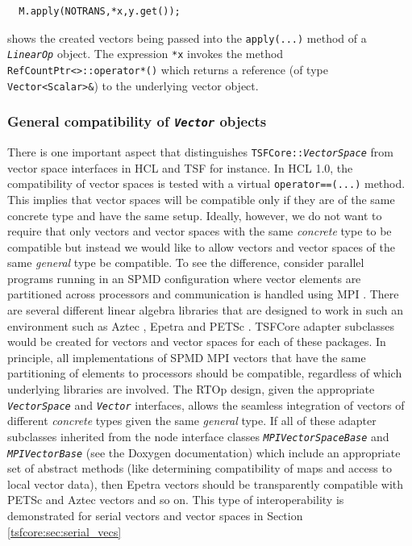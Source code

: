 {\scriptsize\begin{verbatim}
  M.apply(NOTRANS,*x,y.get());
\end{verbatim}}

{}\noindent{}shows the created vectors being passed into the
{}\texttt{apply(\-...)}  method of a {}\texttt{\textit{LinearOp}}
object.  The expression {}\texttt{*x} invokes the method
{}\texttt{RefCountPtr<>\-::operator*()} which returns a reference (of
type {}\texttt{Vector<Scalar>\&}) to the underlying vector object.

%
\subsubsection{General compatibility of {}\texttt{\textit{Vector}} objects}
\label{tsfcore:sec:vec_spc_compatibility}
%

There is one important aspect that distinguishes
{}\texttt{TSFCore\-::\textit{VectorSpace}} from vector space
interfaces in HCL and TSF for instance.  In HCL 1.0, the compatibility
of vector spaces is tested with a virtual {}\texttt{operator==(...)}
method.  This implies that vector spaces will be compatible only if
they are of the same concrete type and have the same setup.  Ideally,
however, we do not want to require that only vectors and vector spaces
with the same {\em concrete} type to be compatible but instead we
would like to allow vectors and vector spaces of the same {\em
general} type be compatible.  To see the difference, consider parallel
programs running in an SPMD configuration where vector elements are
partitioned across processors and communication is handled using MPI
{}\cite{ref:mpi}.  There are several different linear algebra
libraries that are designed to work in such an environment such as
Aztec {}\cite{sd:aztec}, Epetra {}\cite{ref:Epetra} and PETSc
{}\cite{ref:petsc}.  TSFCore adapter subclasses would be created for
vectors and vector spaces for each of these packages.  In principle,
all implementations of SPMD MPI vectors that have the same
partitioning of elements to processors should be compatible,
regardless of which underlying libraries are involved.  The RTOp
design, given the appropriate {}\texttt{\textit{VectorSpace}} and
{}\texttt{\textit{Vector}} interfaces, allows the seamless integration
of vectors of different {\em concrete} types given the same {\em
general} type.  If all of these adapter subclasses inherited from the
node interface classes {}\texttt{\textit{MPIVectorSpaceBase}} and
{}\texttt{\textit{MPIVectorBase}} (see the Doxygen documentation)
which include an appropriate set of abstract methods (like determining
compatibility of maps and access to local vector data), then Epetra
vectors should be transparently compatible with PETSc and Aztec
vectors and so on.  This type of interoperability is demonstrated for
serial vectors and vector spaces in Section
{}\ref{tsfcore:sec:serial_vecs}

